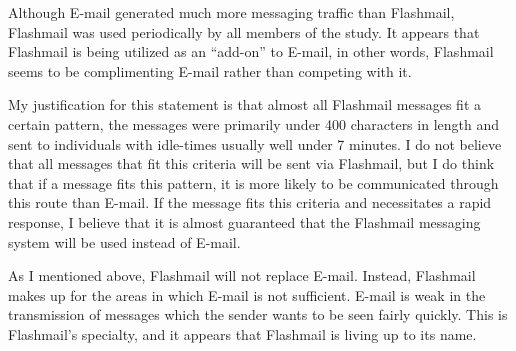 Although E-mail generated much more messaging traffic than Flashmail,
Flashmail was used periodically by all members of the study.  It appears
that Flashmail is being utilized as an ``add-on'' to E-mail, in other
words, Flashmail seems to be complimenting E-mail rather than competing
with it.

My justification for this statement is that almost all Flashmail messages
fit a certain pattern, the messages were primarily under 400 characters in
length and sent to individuals with idle-times usually well under 7
minutes.  I do not believe that all messages that fit this criteria will be
sent via Flashmail, but I do think that if a message fits this pattern, it
is more likely to be communicated through this route than E-mail.  If the
message fits this criteria and necessitates a rapid response, I believe
that it is almost guaranteed that the Flashmail messaging system will be
used instead of E-mail.

As I mentioned above, Flashmail will not replace E-mail. Instead, Flashmail
makes up for the areas in which E-mail is not sufficient.  E-mail is weak
in the transmission of messages which the sender wants to be seen fairly
quickly.  This is Flashmail's specialty, and it appears that Flashmail is
living up to its name.  \nocite{*}
  \printindex




















